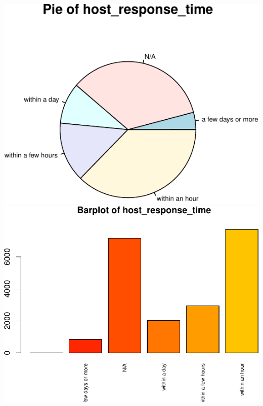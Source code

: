 \includegraphics{anal_files/figure-latex/unnamed-chunk-7-2.pdf}
\includegraphics{anal_files/figure-latex/unnamed-chunk-7-3.pdf}

